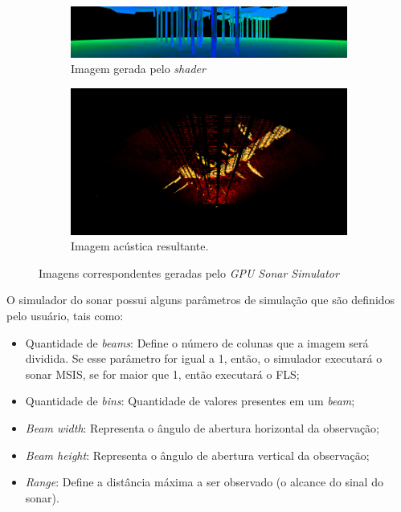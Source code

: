 \begin{figure}[H]
    \centering
    \begin{subfigure}[t]{0.7\textwidth}
        \includegraphics[width=\textwidth]{dados/figuras/shader_output1.png}
        \caption{Imagem gerada pelo \textit{shader}}
    \end{subfigure}
    \begin{subfigure}[t]{0.7\textwidth}
        \includegraphics[width=\textwidth]{dados/figuras/shader_output2.png}
        \caption{Imagem acústica resultante.}
    \end{subfigure}
    \caption{Imagens correspondentes geradas pelo \textit{GPU Sonar Simulator}}
    \vspace{-0.8em}
    \label{fig:shader_output}
\end{figure}

O simulador do sonar possui alguns parâmetros de simulação que são definidos pelo usuário, tais como:

\begin{itemize}
    \item Quantidade de \textit{beams}: Define o número de colunas que a imagem será dividida. Se esse parâmetro for igual a 1, então, o simulador executará o sonar MSIS, se for maior que 1, então executará o FLS;
    \item Quantidade de \textit{bins}: Quantidade de valores presentes em um \textit{beam};
    \item \textit{Beam width}: Representa o ângulo de abertura horizontal da observação;
    \item \textit{Beam height}: Representa o ângulo de abertura vertical da observação;
    \item \textit{Range}: Define a distância máxima a ser observado (o alcance do sinal do sonar).
\end{itemize}
\hspace{1em}

